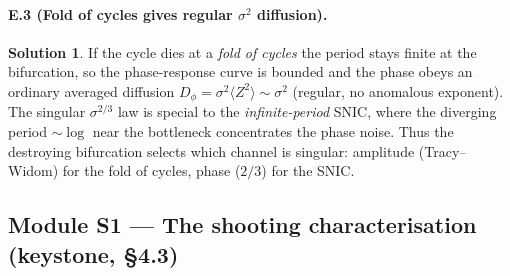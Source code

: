 \documentclass[11pt]{article}
\theoremstyle{definition}
\newtheorem*{sol}{Solution}
\begin{document}
\paragraph{E.3 (Fold of cycles gives regular $\sigma^2$ diffusion).}
\begin{sol}
If the cycle dies at a \emph{fold of cycles} the period stays finite at the bifurcation, so the
phase-response curve is bounded and the phase obeys an ordinary averaged diffusion
$D_\phi=\sigma^2\langle Z^2\rangle\sim\sigma^2$ (regular, no anomalous exponent). The singular
$\sigma^{2/3}$ law is special to the \emph{infinite-period} SNIC, where the diverging period
$\sim\log$ near the bottleneck concentrates the phase noise. Thus the destroying bifurcation
selects which channel is singular: amplitude (Tracy--Widom) for the fold of cycles, phase
($2/3$) for the SNIC.
\end{sol}

\subsection*{Module S1 --- The shooting characterisation (keystone, \S4.3)}
\end{document}
